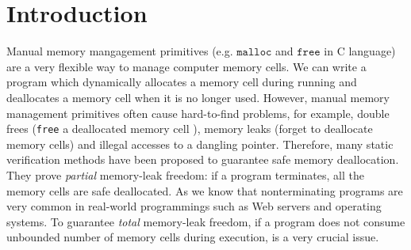 \section{Introduction}
\label{sec:introduction}
Manual memory mangagement primitives (e.g. \(\texttt{malloc}\) and
\(\texttt{free}\) in C language) are a very flexible way to manage
computer memory cells.  We can write a program which dynamically
allocates a memory cell during running and deallocates a memory cell
when it is no longer used. However, manual memory management
primitives often cause hard-to-find problems, for example, double
frees (\texttt{free} a deallocated memory cell ), memory leaks (forget
to deallocate memory cells) and illegal accesses to a dangling
pointer. Therefore, many static verification methods have been
proposed to guarantee safe memory deallocation. They prove
\emph{partial} memory-leak freedom: if a program terminates, all the
memory cells are safe deallocated. As we know that nonterminating
programs are very common in real-world programmings such as Web
servers and operating systems. To guarantee \emph{total} memory-leak
freedom, if a program does not consume unbounded number of memory
cells during execution, is a very crucial issue.
